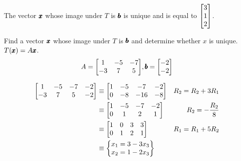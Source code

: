 \documentclass{../mathhomework}
\newenvironment{Mat}{\begin{bmatrix}}{\end{bmatrix}}
\begin{document}
\begin{problem}[1.8\#3]
\begin{solution}
        The vector $\pmb{x}$ whose image under $T$ is $\pmb{b}$ is unique and is equal to $\begin{Mat}
            3 \\ 1 \\ 2
        \end{Mat}$.
    \end{solution}
\end{problem}

\begin{problem}[1.8\#5]
    Find a vector $\pmb{x}$ whose image under $T$ is $\pmb{b}$ and determine whether $x$ is unique. $T(\pmb{x}) = A\pmb{x}$.
    \begin{equation*}
        A = \begin{Mat}
            1 & -5 & -7 \\
            -3 & 7 & 5
        \end{Mat},
        \Vect{b} = \begin{Mat}
            -2 \\ -2
        \end{Mat}
    \end{equation*}

    \begin{solution}
        \begin{align*}
            \begin{Mat}
                1 & -5 & -7 & -2\\
                -3 & 7 & 5 & -2
            \end{Mat} & \equiv
            \begin{Mat}
                1 & -5 & -7 & -2\\
                0 & -8 & -16 & -8
            \end{Mat} & R_2 = R_2 + 3R_1 \\ & \equiv
            \begin{Mat}
                1 & -5 & -7 & -2\\
                0 & 1 & 2 & 1
            \end{Mat} & R_2 = -\frac{R_2}{8} \\ & \equiv
            \begin{Mat}
                1 & 0 & 3 & 3\\
                0 & 1 & 2 & 1
            \end{Mat} & R_1 = R_1 + 5R_2 \\ & \equiv
            \begin{Bmatrix}
                x_1 = 3 - 3x_3 \\ 
                x_2 = 1 - 2x_3
            \end{Bmatrix}
        \end{align*}


\end{solution}
\end{problem}
\end{document}
